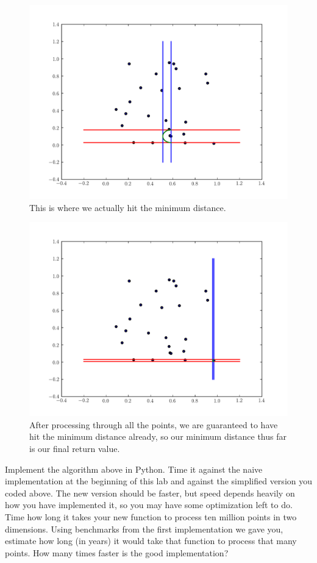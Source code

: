 \begin{figure}[H]
\includegraphics[width = .8\textwidth]{sweep13.pdf}
\caption{This is where we actually hit the minimum distance.}
\end{figure}

\begin{figure}[H]
\includegraphics[width = .8\textwidth]{sweep22.pdf}
\caption{After processing through all the points, we are guaranteed to have hit the minimum distance already, so our minimum distance thus far is our final return value.}
\end{figure}


\begin{problem}
Implement the algorithm above in Python. 
Time it against the naive implementation at the beginning of this lab and against the simplified version you coded above.
The new version should be faster, but speed depends heavily on how you have implemented it, so you may have some optimization left to do.
Time how long it takes your new function to process ten million points in two dimensions. 
Using benchmarks from the first implementation we gave you, estimate how long (in years) it would take that function to process that many points.
How many times faster is the good implementation?
\end{problem}

